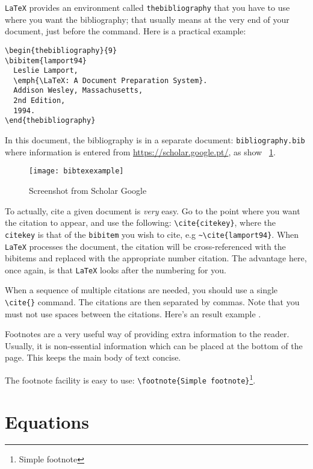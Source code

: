 \texttt{LaTeX} provides an environment called \texttt{thebibliography} that you have to use where you want the bibliography; that usually means at the very end of your document, just before the \verb!! command. Here is a practical example:

\begin{verbatim}
\begin{thebibliography}{9}
\bibitem{lamport94}
  Leslie Lamport,
  \emph{\LaTeX: A Document Preparation System}.
  Addison Wesley, Massachusetts,
  2nd Edition,
  1994.
\end{thebibliography}
\end{verbatim}

In this document, the bibliography is in a separate document: \texttt{bi\-blio\-gra\-phy.bib}  where information is entered from \url{https://scholar.google.pt/}, as show  \figurename~\ref{fig:bibtex}.

\begin{figure}[ht]
	\centering
	\texttt{[image: bibtexexample]}
	  \caption{Screenshot from Scholar Google}
  \label{fig:bibtex}
\end{figure}

To actually, cite a given document is \textit{very} easy. Go to the point where you want the citation to appear, and use the following: \verb!\cite{citekey}!, where the \texttt{citekey} is that of the \texttt{bibitem} you wish to cite, e.g \verb!~\cite{lamport94}!.  When \texttt{LaTeX} processes the document, the citation will be cross-referenced with the bibitems and replaced with the appropriate number citation. The advantage here, once again, is that \texttt{LaTeX} looks after the numbering for you.

When a sequence of multiple citations are needed, you should use a single \verb!\cite{}! command. The citations are then separated by commas. Note that you must not use spaces between the citations. Here's an result example \cite{strunk,chicago,texbook}.

Footnotes are a very useful way of providing extra information to the reader. Usually, it is non-essential information which can be placed at the bottom of the page. This keeps the main body of text concise.

The footnote facility is easy to use: \verb!\footnote{Simple footnote}!\footnote{Simple footnote}. 

\section{Equations}

